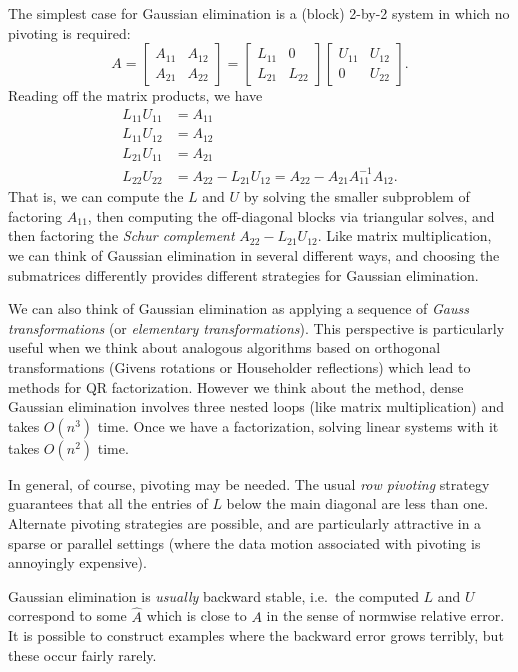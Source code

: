 \documentclass[12pt, leqno]{article}
\begin{document}
The simplest case for Gaussian elimination is a (block) 2-by-2 system
in which no pivoting is required:
\[
A = \begin{bmatrix} A_{11} & A_{12} \\ A_{21} & A_{22} \end{bmatrix}
  = \begin{bmatrix} L_{11} & 0 \\ L_{21} & L_{22} \end{bmatrix}
    \begin{bmatrix} U_{11} & U_{12} \\ 0 & U_{22} \end{bmatrix}.
\]
Reading off the matrix products, we have
\begin{align*}
  L_{11} U_{11} &= A_{11} \\
  L_{11} U_{12} &= A_{12} \\
  L_{21} U_{11} &= A_{21} \\
  L_{22} U_{22} &= A_{22} - L_{21} U_{12}
               = A_{22} - A_{21} A_{11}^{-1} A_{12}.
\end{align*}
That is, we can compute the $L$ and $U$ by solving the smaller
subproblem of factoring $A_{11}$, then computing the off-diagonal
blocks via triangular solves, and then factoring the {\em Schur
  complement} $A_{22}-L_{21} U_{12}$.  Like matrix multiplication, we
can think of Gaussian elimination in several different ways, and
choosing the submatrices differently provides different strategies for
Gaussian elimination.

We can also think of Gaussian elimination as applying a sequence of
{\em Gauss transformations} (or {\em elementary transformations}).
This perspective is particularly useful when we think about analogous
algorithms based on orthogonal transformations (Givens rotations or
Householder reflections) which lead to methods for QR factorization.
However we think about the method, dense Gaussian elimination involves
three nested loops (like matrix multiplication) and takes $O(n^3)$
time.  Once we have a factorization, solving linear systems with it
takes $O(n^2)$ time.

In general, of course, pivoting may be needed.  The usual
{\em row pivoting} strategy guarantees that all the entries of $L$ below the
main diagonal are less than one.  Alternate pivoting strategies are
possible, and are particularly attractive in a sparse or parallel
settings (where the data motion associated with pivoting is annoyingly
expensive).

Gaussian elimination is {\em usually} backward stable, i.e.~the
computed $L$ and $U$ correspond to some $\hat{A}$ which is close to
$A$ in the sense of normwise relative error.  It is possible
to construct examples where the backward error grows terribly,
but these occur fairly rarely.
\end{document}
